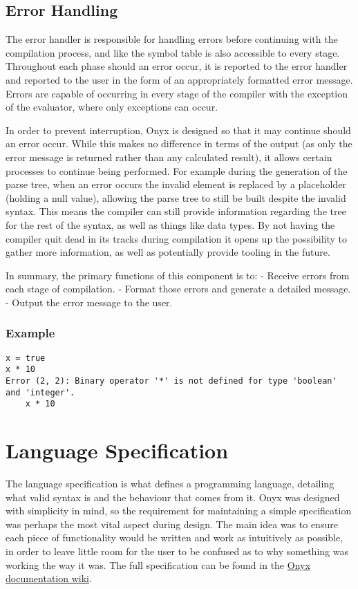 \documentclass[
]{report}
\begin{document}
\subsection{Error Handling}
The error handler is responsible for handling errors before continuing
with the compilation process, and like the symbol table is also
accessible to every stage. Throughout each phase should an error occur,
it is reported to the error handler and reported to the user in the form
of an appropriately formatted error message. Errors are capable of
occurring in every stage of the compiler with the exception of the
evaluator, where only exceptions can occur.

In order to prevent interruption, Onyx is designed so that it may
continue should an error occur. While this makes no difference in terms
of the output (as only the error message is returned rather than any
calculated result), it allows certain processes to continue being
performed. For example during the generation of the parse tree, when an
error occurs the invalid element is replaced by a placeholder (holding a
null value), allowing the parse tree to still be built despite the
invalid syntax. This means the compiler can still provide information
regarding the tree for the rest of the syntax, as well as things like
data types. By not having the compiler quit dead in its tracks during
compilation it opens up the possibility to gather more information, as
well as potentially provide tooling in the future.

In summary, the primary functions of this component is to: - Receive
errors from each stage of compilation. - Format those errors and
generate a detailed message. - Output the error message to the user.

\subsubsection{Example}
\begin{verbatim}
x = true
x * 10
Error (2, 2): Binary operator '*' is not defined for type 'boolean' and 'integer'.
    x * 10
\end{verbatim}

\section{Language Specification}
The language specification is what defines a programming language,
detailing what valid syntax is and the behaviour that comes from it.
Onyx was designed with simplicity in mind, so the requirement for
maintaining a simple specification was perhaps the most vital aspect
during design. The main idea was to ensure each piece of functionality
would be written and work as intuitively as possible, in order to leave
little room for the user to be confused as to why something was working
the way it was. The full specification can be found in the
\href{https://github.com/louislefevre/onyx-compiler/wiki}{Onyx
documentation wiki}.
\end{document}
